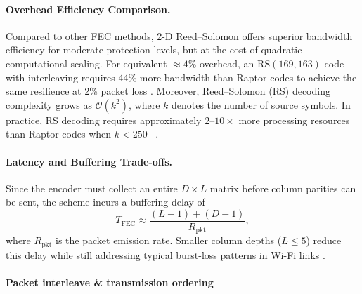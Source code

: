 \paragraph{Overhead Efficiency Comparison.}
\label{sec:overhead efficiency comparison}

Compared to other FEC methods, 2-D Reed--Solomon offers superior bandwidth efficiency for moderate protection levels, but at the cost of quadratic computational scaling.  
For equivalent \(\approx 4\%\) overhead, an \(\mathrm{RS}(169,163)\) code with interleaving requires 44\% more bandwidth than Raptor codes to achieve the same resilience at 2\% packet loss \cite{raptor_vs_rs}.  
Moreover, Reed–Solomon (RS) decoding complexity grows as 
\(\mathcal{O}(k^2)\), where \(k\) denotes the number of source symbols. 
In practice, RS decoding requires approximately \(2\text{--}10\times\) more 
processing resources than Raptor codes when \(k < 250\) ~\cite{raptor_vs_rs}.

\paragraph{Latency and Buffering Trade-offs.}
\label{sec:latency buffering tradeoffs}

Since the encoder must collect an entire \(D \times L\) matrix before column parities can be sent, the scheme incurs a buffering delay of  
\begin{equation}
	T_{\mathrm{FEC}} \approx \frac{(L - 1) + (D - 1)}{R_{\mathrm{pkt}}},
\end{equation}
where \(R_{\mathrm{pkt}}\) is the packet emission rate.  
Smaller column depths (\(L \le 5\)) reduce this delay while still addressing typical burst-loss patterns in Wi-Fi links \cite{smpte2022,fec_video_study}.  


\paragraph{Packet interleave \& transmission ordering}
\label{sec:packet interleave ordering}

